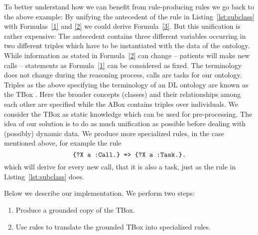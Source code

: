 To better understand how we can benefit from rule-producing rules we go back to the above example: 
By unifying the antecedent of the rule in Listing~\ref{lst:subclass} with Formulas~\ref{1} and \ref{2} we could derive Formula~\ref{3}.
But this unification is rather expensive: The antecedent contains three different variables occurring 
in two different triples which have to be instantiated with the data of the ontology. %
While information as stated in 
Formula~\ref{2} can change -- patients will make new calls -- statements as Formula~\ref{1} can be considered as fixed.
The terminology does not change during the reasoning process,
calls are tasks for our ontology. %
Triples as the above specifying the terminology of an DL ontology are known as the TBox \cite[chapter 1]{dl}. 
Here the broader concepts (classes) and their relationships among each other are specified  
while the ABox contains triples over individuals.
We consider the
TBox as static knowledge which can be used for pre-processing. The idea of our solution is to do as much unification as possible before dealing with (possibly) dynamic data. 
We produce more specialized rules, in the case mentioned above, for example the rule
%
\begin{equation} 
\verb!{?X a :Call.} => {?X a :Task.}.!
\label{4}
\end{equation}
which will derive for every new call, that it is also a task, just as the rule in Listing~\ref{lst:subclass} does.

Below we describe our implementation.
We perform two steps:
\begin{enumerate}
 \item Produce a grounded copy of the  TBox. 
 \item Use rules to translate the grounded TBox into specialized rules.
\end{enumerate}

